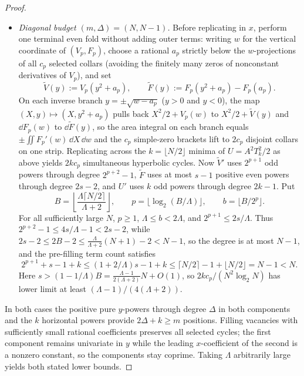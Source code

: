 \begin{proof}
\begin{itemize}[nosep]
 \item \emph{Diagonal budget \((m,\Delta)=(N,N-1)\).} Before replicating in \(x\), perform one terminal even fold without adding outer terms: writing \(w\) for the vertical coordinate of \((V_p,F_p)\), choose a rational \(a_p\) strictly below the \(w\)-projections of all \(c_p\) selected collars (avoiding the finitely many zeros of nonconstant derivatives of \(V_p\)), and set
 \[
  \widetilde V(y):=V_p(y^2+a_p),\qquad \widetilde F(y):=F_p(y^2+a_p)-F_p(a_p).
 \]
 On each inverse branch \(y=\pm\sqrt{w-a_p}\) (\(y>0\) and \(y<0\)), the map \((X,y)\mapsto(X,y^2+a_p)\) pulls back \(X^2/2+V_p(w)\) to \(X^2/2+\widetilde V(y)\) and \(\dd F_p(w)\) to \(\dd\widetilde F(y)\), so the area integral on each branch equals \(\pm\iint F_p'(w)\,\dd X\,\dd w\) and the \(c_p\) simple-zero brackets lift to \(2c_p\) disjoint collars on one strip. Replicating across the \(k=\lfloor N/2\rfloor\) minima of \(U=A^2T_k^2/2\) as above yields \(2kc_p\) simultaneous hyperbolic cycles. Now \(\widetilde V'\) uses \(2^{p+1}\) odd powers through degree \(2^{p+2}-1\), \(\widetilde F\) uses at most \(s-1\) positive even powers through degree \(2s-2\), and \(U'\) uses \(k\) odd powers through degree \(2k-1\). Put
 \[
  B=\left\lfloor\frac{\Lambda\lceil N/2\rceil}{\Lambda+2}\right\rfloor,\qquad
  p=\lfloor\log_2(B/\Lambda)\rfloor,\qquad b=\lfloor B/2^p\rfloor .
 \]
 For all sufficiently large \(N\), \(p\ge1\), \(\Lambda\le b<2\Lambda\), and \(2^{p+1}\le 2s/\Lambda\). Thus \(2^{p+2}-1\le 4s/\Lambda-1<2s-2\), while \(2s-2\le 2B-2\le\frac{\Lambda}{\Lambda+2}(N+1)-2<N-1\), so the degree is at most \(N-1\), and the pre-filling term count satisfies
 \[
  2^{p+1}+s-1+k\le(1+2/\Lambda)s-1+k\le \lceil N/2\rceil-1+\lfloor N/2\rfloor=N-1<N .
 \]
 Here \(s>(1-1/\Lambda)B=\frac{\Lambda-1}{2(\Lambda+2)}N+O(1)\), so \(2kc_p/(N^2\log_2 N)\) has lower limit at least \((\Lambda-1)/(4(\Lambda+2))\).
\end{itemize}

In both cases the positive pure \(y\)-powers through degree \(\Delta\) in both components and the \(k\) horizontal powers provide \(2\Delta+k\ge m\) positions. Filling vacancies with sufficiently small rational coefficients preserves all selected cycles; the first component remains univariate in \(y\) while the leading \(x\)-coefficient of the second is a nonzero constant, so the components stay coprime. Taking \(\Lambda\) arbitrarily large yields both stated lower bounds.
\end{proof}
